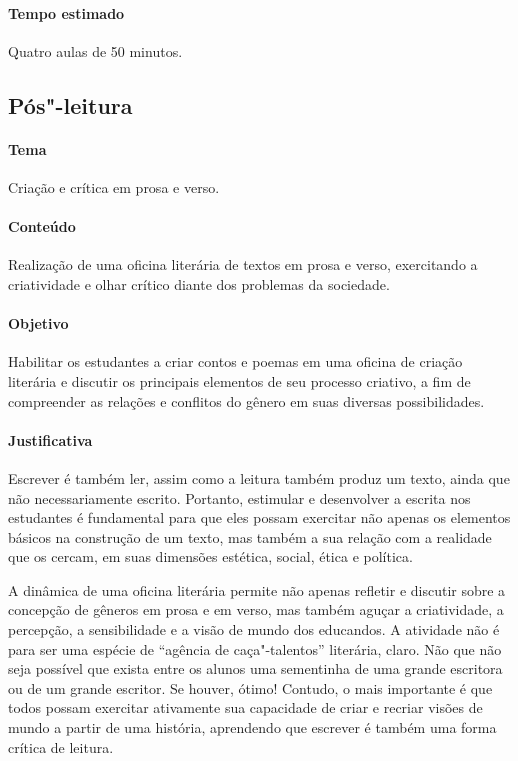 \documentclass[12pt]{extarticle}
\begin{document}
\paragraph{Tempo estimado} Quatro aulas de 50 minutos.

\subsection{Pós"-leitura}

\paragraph{Tema} Criação e crítica em prosa e verso.

\paragraph{Conteúdo} Realização de uma oficina literária de textos em
prosa e verso, exercitando a criatividade e olhar crítico diante dos
problemas da sociedade.

\paragraph{Objetivo} Habilitar os estudantes a criar contos e poemas em
uma oficina de criação literária e discutir os principais elementos de
seu processo criativo, a fim de compreender as relações e conflitos do
gênero em suas diversas possibilidades.

\paragraph{Justificativa} Escrever é também ler, assim como a leitura
também produz um texto, ainda que não necessariamente escrito. Portanto,
estimular e desenvolver a escrita nos estudantes é fundamental para que
eles possam exercitar não apenas os elementos básicos na construção de
um texto, mas também a sua relação com a realidade que os cercam, em
suas dimensões estética, social, ética e política.

A dinâmica de uma oficina literária permite não apenas refletir e
discutir sobre a concepção de gêneros em prosa e em verso, mas também
aguçar a criatividade, a percepção, a sensibilidade e a visão de mundo
dos educandos. A atividade não é para ser uma espécie de ``agência de
caça"-talentos'' literária, claro. Não que não seja possível que exista
entre os alunos uma sementinha de uma grande escritora ou de um grande
escritor. Se houver, ótimo! Contudo, o mais importante é que todos
possam exercitar ativamente sua capacidade de criar e recriar visões de
mundo a partir de uma história, aprendendo que escrever é também uma
forma crítica de leitura.
\end{document}
